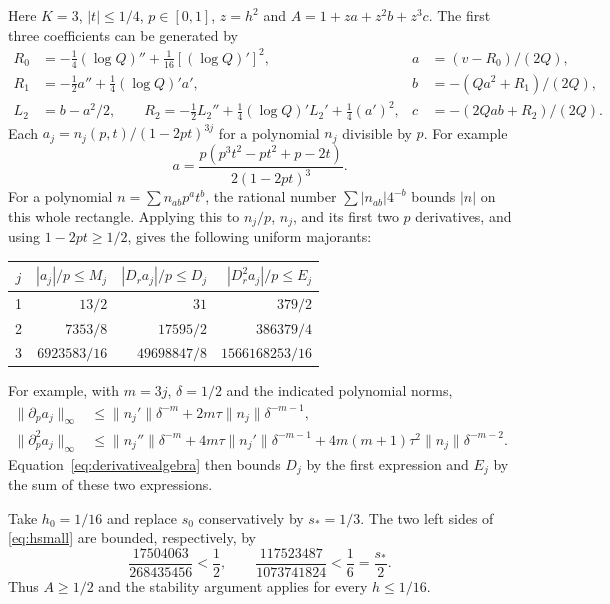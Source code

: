 \documentclass[10pt]{article}
\begin{document}
Here $K=3$, $|t|\le1/4$, $p\in[0,1]$, $z=h^2$ and
$A=1+za+z^2b+z^3c$. The first three coefficients can be generated by
\begin{align*}
R_0&=-\tfrac14(\log Q)''+\tfrac1{16}[(\log Q)']^2,
&a&=(v-R_0)/(2Q),\\
R_1&=-\tfrac12a''+\tfrac14(\log Q)'a',
&b&=-(Qa^2+R_1)/(2Q),\\
L_2&=b-a^2/2,\qquad
R_2=-\tfrac12L_2''+\tfrac14(\log Q)'L_2'+\tfrac14(a')^2,
&c&=-(2Qab+R_2)/(2Q).
\end{align*}
Each $a_j=n_j(p,t)/(1-2pt)^{3j}$ for a polynomial $n_j$
divisible by $p$. For example
\[
a=\frac{p(p^3t^2-pt^2+p-2t)}{2(1-2pt)^3}.
\]
For a polynomial $n=\sum n_{ab}p^at^b$, the rational number
$\sum|n_{ab}|4^{-b}$ bounds $|n|$ on this whole rectangle.
Applying this to $n_j/p$, $n_j$, and its first two $p$ derivatives,
and using $1-2pt\ge1/2$, gives the following uniform majorants:
\begin{center}
\begin{tabular}{crrr}
\toprule
$j$ & $|a_j|/p\le M_j$ & $|D_ra_j|/p\le D_j$
 & $|D_r^2a_j|/p\le E_j$\\
\midrule
1 & $13/2$ & $31$ & $379/2$\\
2 & $7353/8$ & $17595/2$ & $386379/4$\\
3 & $6923583/16$ & $49698847/8$ & $1566168253/16$\\
\bottomrule
\end{tabular}
\end{center}
For example, with $m=3j$, $\delta=1/2$ and the indicated
polynomial norms,
\begin{align*}
\|\partial_pa_j\|_\infty
&\le\|n_j'\|\delta^{-m}+2m\tau\|n_j\|\delta^{-m-1},\\
\|\partial_p^2a_j\|_\infty
&\le\|n_j''\|\delta^{-m}+4m\tau\|n_j'\|\delta^{-m-1}
 +4m(m+1)\tau^2\|n_j\|\delta^{-m-2}.
\end{align*}
Equation~\eqref{eq:derivativealgebra} then bounds $D_j$ by the
first expression and $E_j$ by the sum of these two expressions.

Take $h_0=1/16$ and replace $s_0$ conservatively by $s_*=1/3$.
The two left sides of \eqref{eq:hsmall} are bounded, respectively, by
\[
\frac{17504063}{268435456}<\frac12,\qquad
\frac{117523487}{1073741824}<\frac16=\frac{s_*}2.
\]
Thus $A\ge1/2$ and the stability argument applies for every
$h\le1/16$.
\end{document}
